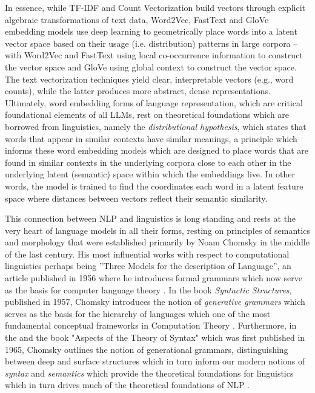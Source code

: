 \documentclass[final]{clv2025}
\begin{document}
In essence, while TF-IDF and Count Vectorization build vectors through explicit algebraic transformations of text data, Word2Vec, FastText and GloVe embedding models use deep learning to geometrically place words into a latent vector space based on their usage (i.e. distribution) patterns in large corpora – with Word2Vec and FastText using local co-occurrence information to construct the vector space and GloVe using global context to construct the vector space. The text vectorization techniques yield clear, interpretable vectors (e.g., word counts), while the latter produces more abstract, dense representations. Ultimately, word embedding forms of language representation, which are critical foundational elements of all LLMs, rest on theoretical foundations which are borrowed from linguistics, namely the \textit{distributional hypothesis}, which states that words that appear in similar contexts have similar meanings, a principle which informs these word embedding models which are designed to place words that are found in similar contexts in the underlying corpora close to each other in the underlying latent (semantic) space within which the embeddings live. In other words, the model is trained to find the coordinates each word in a latent feature space where distances between vectors reflect their semantic similarity.

This connection between NLP and linguistics is long standing and rests at the very heart of language models in all their forms, resting on principles of semantics and morphology that were established primarily by Noam Chomsky in the middle of the last century. His most influential works with respect to computational linguistics perhaps being ''Three Models for the description of Language'', an article published in 1956 where he introduces formal grammars which now serve as the basis for computer language theory \cite{chomsky56}. In the book \textit{Syntactic Structures}, published in 1957, Chomsky introduces the notion of \textit{generative grammars} which serves as the basis for the hierarchy of languages which one of the most fundamental conceptual frameworks in Computation Theory \cite{Chomsky57}. Furthermore, in the and the book "Aspects of the Theory of Syntax" which was first published in 1965, Chomsky outlines the notion of generational grammars, distinguishing between deep and surface structures which in turn inform our modern notions of \textit{syntax} and \textit{semantics} which provide the theoretical foundations for linguistics which in turn drives much of the theoretical foundations of NLP \cite{chomsky65aspects}.
\end{document}

